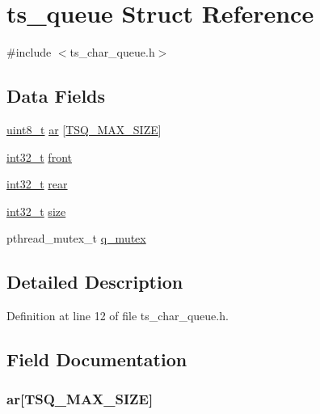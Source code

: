 \hypertarget{structts__queue}{\section{ts\-\_\-queue Struct Reference}
\label{structts__queue}
}


{\ttfamily \#include $<$ts\-\_\-char\-\_\-queue.\-h$>$}

\subsection*{Data Fields}
\begin{DoxyCompactItemize}
\item 
\hyperlink{spec__types_8h_aba7bc1797add20fe3efdf37ced1182c5}{uint8\-\_\-t} \hyperlink{structts__queue_ada12f5297faf3bf3d9955465db8ec485}{ar} \mbox{[}\hyperlink{ts__char__queue_8h_ac81a9970697c6f5f535f3eaf9d50b207}{T\-S\-Q\-\_\-\-M\-A\-X\-\_\-\-S\-I\-Z\-E}\mbox{]}
\item 
\hyperlink{spec__types_8h_a32f2e37ee053cf2ce8ca28d1f74630e5}{int32\-\_\-t} \hyperlink{structts__queue_a1dfd5b5d6a134e4dca437c77ed8c6a08}{front}
\item 
\hyperlink{spec__types_8h_a32f2e37ee053cf2ce8ca28d1f74630e5}{int32\-\_\-t} \hyperlink{structts__queue_ae2307aa4cbe13c4e3f4e5f88bfe3346b}{rear}
\item 
\hyperlink{spec__types_8h_a32f2e37ee053cf2ce8ca28d1f74630e5}{int32\-\_\-t} \hyperlink{structts__queue_af8fd9ce16b371c8a3bf5e0b37a69419f}{size}
\item 
pthread\-\_\-mutex\-\_\-t \hyperlink{structts__queue_a03fe278d10d0b596601485a37a3c5c42}{q\-\_\-mutex}
\end{DoxyCompactItemize}


\subsection{Detailed Description}


Definition at line 12 of file ts\-\_\-char\-\_\-queue.\-h.



\subsection{Field Documentation}
\hypertarget{structts__queue_ada12f5297faf3bf3d9955465db8ec485}{
\subsubsection[{ar}]{ ar\mbox{[}{\bf T\-S\-Q\-\_\-\-M\-A\-X\-\_\-\-S\-I\-Z\-E}\mbox{]}}}\label{structts__queue_ada12f5297faf3bf3d9955465db8ec485}


